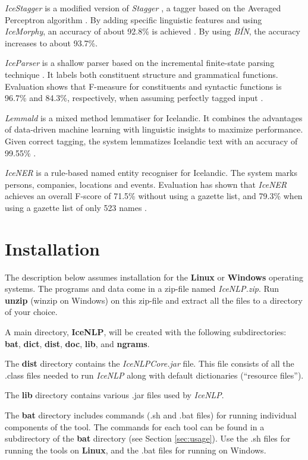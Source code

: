 \documentclass[11pt]{article}
\begin{document}
\emph{IceStagger} is a modified version of \emph{Stagger}  \citep{ost13}, a tagger based on the Averaged Perceptron algorithm \citep{col02}.   By adding specific linguistic features and using \emph{IceMorphy}, an accuracy of about 92.8\% is achieved \citep{lof13}. By using \emph{BÍN}, the accuracy increases to about 93.7\%.

\emph{IceParser} is a shallow parser based on the incremental finite-state parsing technique \citep{mok97}.
It labels both constituent structure and grammatical functions.
Evaluation shows that F-measure for constituents and syntactic functions is 96.7\% and 84.3\%, respectively, when assuming perfectly tagged input \citep{lof07b}.

\emph{Lemmald} is a mixed method lemmatiser for Icelandic.
It combines the advantages of data-driven machine learning with linguistic insights to maximize performance.
Given correct tagging, the system lemmatizes Icelandic text with an accuracy of 99.55\% \citep{ant08}.

\emph{IceNER} is a rule-based named entity recogniser for Icelandic.
The system marks persons, companies, locations and events.
Evaluation has shown that \emph{IceNER} achieves an overall F-score of 71.5\% without using a gazette list, and 79.3\% when using a gazette list of only 523 names \citep{try09}.

\section{Installation}
The description below assumes installation for the {\bf Linux} or {\bf Windows} operating systems.
The programs and data come in a zip-file named \emph{IceNLP.zip}.
Run {\bf unzip} (winzip on Windows) on this zip-file and extract all the files to a directory of your choice.

A main directory, {\bf IceNLP}, will be created with the following subdirectories: {\bf bat}, {\bf dict}, {\bf dist}, {\bf doc}, {\bf lib}, and {\bf ngrams}.

The {\bf dist} directory contains the \emph{IceNLPCore.jar} file.  This file consists of all the .class files needed to run \emph{IceNLP} along with default dictionaries (``resource files''). 

The {\bf lib} directory contains various .jar files used by \emph{IceNLP}. 

The {\bf bat} directory includes commands (.sh and .bat files) for running individual components of the tool.
The commands for each tool can be found in a subdirectory of the {\bf bat} directory (see Section \ref{sec:usage}).
Use the .sh files for running the tools on \textbf{Linux}, and the .bat files for running on Windows.
\end{document}
